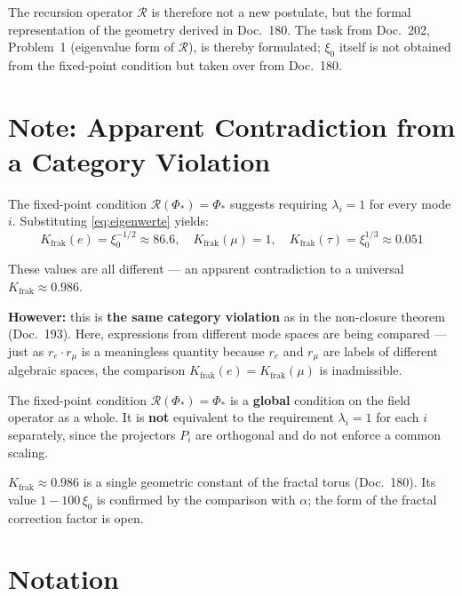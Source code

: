 The recursion operator $\mathcal{R}$ is therefore not a new postulate,
but the formal representation of the geometry derived in Doc.~180.
The task from Doc.~202, Problem~1 (eigenvalue form of $\mathcal{R}$),
is thereby formulated; $\xi_0$ itself is not obtained from the
fixed-point condition but taken over from Doc.~180.

\section{Note: Apparent Contradiction from a Category Violation}

The fixed-point condition $\mathcal{R}(\Phi_*) = \Phi_*$ suggests
requiring $\lambda_i = 1$ for every mode $i$. Substituting
\eqref{eq:eigenwerte} yields:
\[
  K_{\text{frak}}(e) = \xi_0^{-1/2} \approx 86.6, \quad
  K_{\text{frak}}(\mu) = 1, \quad
  K_{\text{frak}}(\tau) = \xi_0^{1/3} \approx 0.051
\]

These values are all different --- an apparent contradiction
to a universal $K_{\text{frak}} \approx 0.986$.

\textbf{However:} this is \textbf{the same category violation}
as in the non-closure theorem (Doc.~193). Here, expressions from
different mode spaces are being compared --- just as
$r_e \cdot r_\mu$ is a meaningless quantity because $r_e$ and
$r_\mu$ are labels of different algebraic spaces,
the comparison $K_{\text{frak}}(e) = K_{\text{frak}}(\mu)$
is inadmissible.

The fixed-point condition $\mathcal{R}(\Phi_*) = \Phi_*$ is a
\textbf{global} condition on the field operator as a whole.
It is \textbf{not} equivalent to the requirement
$\lambda_i = 1$ for each $i$ separately, since the projectors
$P_i$ are orthogonal and do not enforce a common scaling.

$K_{\text{frak}} \approx 0.986$ is a single geometric
constant of the fractal torus (Doc.~180). Its value $1-100\,\xi_0$
is confirmed by the comparison with $\alpha$; the form of the fractal
correction factor is open.


\section*{Notation}

